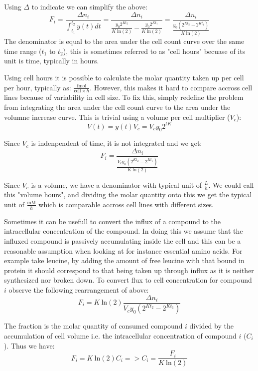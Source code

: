 Using $\Delta$ to indicate we can simplify the above:
$$
F_i = \frac{\Delta n_i}{\int_{t_1}^{t_2} y(t) dt} = \frac{\Delta n_i}{\frac{y_0 2^{K t_2}}{K\ \text{ln}(2)} - \frac{y_0 2^{K t_1}}{K\ \text{ln}(2)}} = \frac{\Delta n_i}{\frac{y_0 (2^{K t_2} - 2^{K t_1})}{K\ \text{ln}(2)}}
$$
The denominator is equal to the area under the cell count curve over the same time range ($t_1$ to $t_2$), this is sometimes referred to as "cell hours" becuase of its unit is time, typically in hours.

Using cell hours it is possible to calculate the molar quantity taken up per cell per hour, typically as: $\frac{\text{fmol}}{\text{cell}\times h}$.
However, this makes it hard to compare accross cell lines because of variability in cell size. To fix this, simply redefine the problem from integrating the area under the cell count curve to the area under the volumne increase curve.
This is trivial using a volume per cell multiplier ($V_c$):
$$
V(t) = y(t) V_c = V_c y_0 2^{t K}
$$

Since $V_c$ is indenpendent of time, it is not integrated and we get:
$$
F_i = \frac{\Delta n_i}{\frac{V_c y_0 (2^{K t_2} - 2^{K t_1})}{K\ \text{ln}(2)}}
$$

Since $V_c$ is a volume, we have a denominator with typical unit of $\frac{L}{h}$.
We could call this "volume hours", and dividing the molar quantity onto this we get the typical unit of $\frac{\text{mM}}{h}$ which is comparable accross cell lines with different sizes.

Sometimes it can be usefull to convert the influx of a compound to the intracellular concentration of the compound.
In doing this we assume that the influxed compound is passively accumulating inside the cell and this can be a reasonable assumption when looking at for instance essential amino acids.
For example take leucine, by adding the amount of free leucine with that bound in protein it should correspond to that being taken up through influx as it is neither synthesized nor broken down.
To convert flux to cell concentration for compound $i$ observe the following rearrangement of above:
$$
F_i = K\ \text{ln}(2) \frac{\Delta n_i}{V_c y_0 (2^{K t_2} - 2^{K t_1})}
$$

The fraction is the molar quantity of consumed compound $i$ divided by the accumulation of cell volume i.e. the intracellular concentration of compound $i$ ($C_i$).
Thus we have:
$$
F_i = K\ \text{ln}(2) C_i => C_i = \frac{F_i}{K\ \text{ln}(2)}
$$










